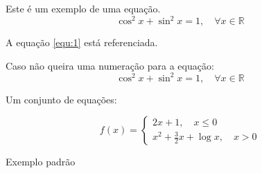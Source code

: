 
        Este é um exemplo de uma equação.
        \begin{equation}
            \cos^{2}{x} + \sin^{2}{x} = 1, \quad \forall x \in \mathbb{R}
            \label{equ:1}
        \end{equation}
        
        A equação \ref{equ:1} está referenciada.
        
        Caso não queira uma numeração para a equação:
        \begin{equation*}
            \cos^{2}{x} + \sin^{2}{x} = 1, \quad \forall x \in \mathbb{R}
        \end{equation*}       
        
        Um conjunto de equações:
        
        \begin{equation}
            f(x) = 
            \begin{cases}
                2x+1, \quad  x \leq 0 \\
               x^2 +\frac{3}{2}x +\log{x},  \quad  x > 0
            \end{cases}
            \label{equ:2}
        \end{equation}   
        
  
        
         Exemplo padrão %
        
